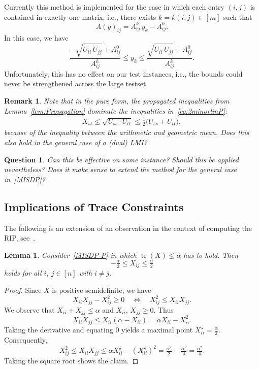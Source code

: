 \documentclass[10pt, a4paper]{article}
\DeclareMathOperator{\tr}{tr}
\newtheorem{lemma}[theorem]{Lemma}
\newtheorem{question}[theorem]{Question}
\newtheorem{remark}[theorem]{Remark}
\begin{document}
Currently this method is implemented for the case in which each entry
$(i,j)$ is contained in exactly one matrix, i.e., there exists
$k = k(i,j) \in [m]$ such that
\[
  A(y)_{ij} = A^k_{ij}\, y_k - A^0_{ij}.
\]
In this case, we have
\[
  \frac{-\sqrt{\tilde{U}_{ii}\,\tilde{U}_{jj}} + A^0_{ij}}{A^k_{ij}} \leq y_k \leq
  \frac{\sqrt{\tilde{U}_{ii}\,\tilde{U}_{jj}} + A^0_{ij}}{A^k_{ij}}.
\]
Unfortunately, this has no effect on our test instances, i.e., the bounds
could never be strengthened across the large testset.

\begin{remark}
  Note that in the pure form, the propagated inequalities from
  Lemma~\ref{lem:Propagation} dominate the inequalities
  in~\eqref{eq:2minorlinP}:
  \begin{align*}
    X_{st} \leq \sqrt{U_{ss} \cdot U_{tt}} \leq \frac{1}{2}\big( U_{ss} + U_{tt}\big),
  \end{align*}
  because of the inequality between the arithmetic and geometric mean. Does
  this also hold in the general case of a (dual) LMI?
\end{remark}

\begin{question}
  Can this be effective on some instance? Should this be applied
  nevertheless? Does it make sense to extend the method for the general
  case in~\eqref{MISDP}?
\end{question}

\subsection{Implications of Trace Constraints}

The following is an extension of an observation in the context of computing
the RIP, see~\cite{GalP16}.

\begin{lemma}
  Consider~\eqref{MISDP-P} in which $\tr(X) \leq \alpha$ has to hold. Then
  \[
    -\tfrac{\alpha}{2} \leq X_{ij} \leq \tfrac{\alpha}{2}
  \]
  holds for all $i$, $j \in [n]$ with $i \neq j$.
\end{lemma}

\begin{proof}
  Since $X$ is positive semidefinite, we have
  \[
    X_{ii} X_{jj} - X_{ij}^2 \geq 0
    \quad\Leftrightarrow\quad
    X_{ij}^2 \leq X_{ii} X_{jj}.
  \]
  We observe that $X_{ii} + X_{jj} \leq \alpha$ and $X_{ii}$,
  $X_{jj} \geq 0$. Thus
  \[
    X_{ii} X_{jj} \leq X_{ii} (\alpha - X_{ii}) = \alpha X_{ii} - X_{ii}^2.
  \]
  Taking the derivative and equating 0 yields a maximal point
  $X_{ii}^\star = \tfrac{\alpha}{2}$. Consequently,
  \[
    X_{ij}^2 \leq X_{ii} X_{jj} \leq \alpha X_{ii}^\star - (X_{ii}^\star)^2 =
    \tfrac{\alpha^2}{2} - \tfrac{\alpha^2}{4} = \tfrac{\alpha^2}{4}.
  \]
  Taking the square root shows the claim.
\end{proof}
\end{document}
